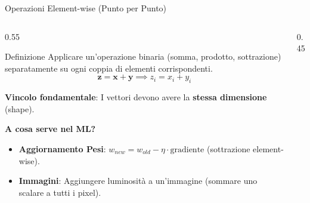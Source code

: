 \documentclass[aspectratio=169, 10pt]{beamer}
\begin{document}
\begin{frame}{Operazioni Element-wise (Punto per Punto)}
    \begin{columns}[T]
        \begin{column}{0.55\textwidth}
            \small %
            \begin{block}{Definizione}
                Applicare un'operazione binaria (somma, prodotto, sottrazione) separatamente su ogni coppia di elementi corrispondenti.
                \[ \mathbf{z} = \mathbf{x} + \mathbf{y} \implies z_i = x_i + y_i \]
            \end{block}
            
            \vspace{0.2em}
            \textbf{Vincolo fondamentale}:
            I vettori devono avere la \textbf{stessa dimensione} (shape).
            
            \vspace{0.5em}
            \textbf{A cosa serve nel ML?}
            \begin{itemize}
                \setlength\itemsep{1pt}
                \item \textbf{Aggiornamento Pesi}: $w_{new} = w_{old} - \eta \cdot \text{gradiente}$ (sottrazione element-wise).
                \item \textbf{Immagini}: Aggiungere luminosità a un'immagine (sommare uno scalare a tutti i pixel).
            \end{itemize}
        \end{column}

        \begin{column}{0.45\textwidth}
            \centering
\end{column}
\end{columns}
\end{frame}
\end{document}
